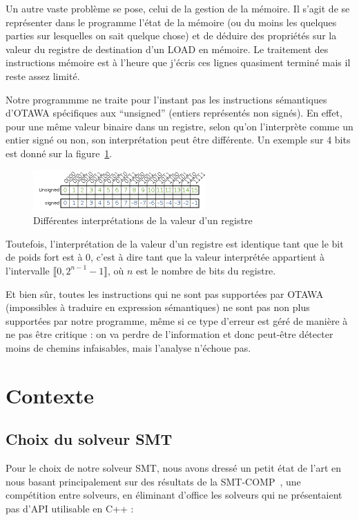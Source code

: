\documentclass[french]{article}
\begin{document}
  Un autre vaste problème se pose, celui de la gestion de la mémoire. Il s'agit de se représenter dans le programme l'état de la mémoire (ou du moins les quelques parties sur lesquelles on sait quelque chose) et de déduire des propriétés sur la valeur du registre de destination d'un LOAD en mémoire. Le traitement des instructions mémoire est à l'heure que j'écris ces lignes quasiment terminé mais il reste assez limité.

  Notre programmme ne traite pour l'instant pas les instructions sémantiques d'OTAWA spécifiques aux ``unsigned'' (entiers représentés non signés). En effet, pour une même valeur binaire dans un registre, selon qu'on l'interprète comme un entier signé ou non, son interprétation peut être différente. Un exemple sur 4 bits est donné sur la figure~\ref{representation_signed_unsigned}.

  \begin{figure}
    \centering
    \includegraphics[width=250px]{pictures/representation_signed_unsigned.png}
    \caption{Différentes interprétations de la valeur d'un registre}
    \label{representation_signed_unsigned}
  \end{figure}

  Toutefois, l'interprétation de la valeur d'un registre est identique tant que le bit de poids fort est à 0, c'est à dire tant que la valeur interprétée appartient à l'intervalle $\llbracket0, 2^{n-1}-1\rrbracket$, où $n$ est le nombre de bits du registre.

  Et bien sûr, toutes les instructions qui ne sont pas supportées par OTAWA (impossibles à traduire en expression sémantiques) ne sont pas non plus supportées par notre programme, même si ce type d'erreur est géré de manière à ne pas être critique : on va perdre de l'information et donc peut-être détecter moins de chemins infaisables, mais l'analyse n'échoue pas.

  \newpage{}
  \section{Contexte}
  \subsection{Choix du solveur SMT}
  Pour le choix de notre solveur SMT, nous avons dressé un petit état de l'art en nous basant principalement sur des résultats de la SMT-COMP~\cite{SMT-COMP}, une compétition entre solveurs, en éliminant d'office les solveurs qui ne présentaient pas d'API utilisable en C++ :
\end{document}
